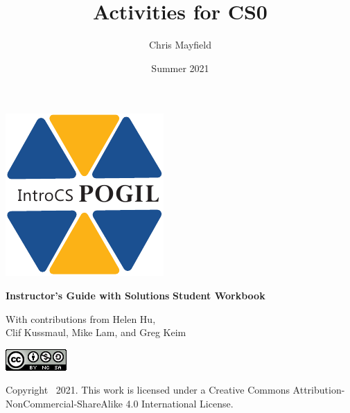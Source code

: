 \documentclass[12pt,twoside,openright]{report}
\title{Activities for CS0}
\author{Chris Mayfield}
\date{Summer 2021}
\begin{document}
\setcounter{page}{1}

\begin{titlepage}
\null\vfill
\centering

\includegraphics{../IntroCS.pdf}

\makeatletter

\vspace*{4em}
\huge \textbf{\@title}

\vspace*{2pt}
\ifdefined\Teacher
\color{DarkRed}
\Large \textbf{Instructor's Guide with Solutions}
\else
\color{ForestGreen}
\Large \textbf{Student Workbook}
\fi
\normalcolor

\vspace*{2em}
\large \@author

\vspace*{4pt}
\small With contributions from Helen Hu, \\ Clif Kussmaul, Mike Lam, and Greg Keim

\vspace*{2em}
\Large \@date

\makeatother

\normalsize

\vspace*{4em}
\includegraphics{../by-nc-sa.png}

\vspace*{1ex}
Copyright \textcopyright\ 2021.
This work is licensed under a Creative Commons Attribution-NonCommercial-ShareAlike 4.0 International License.

%

\vfill\null
\end{titlepage}
\end{document}
